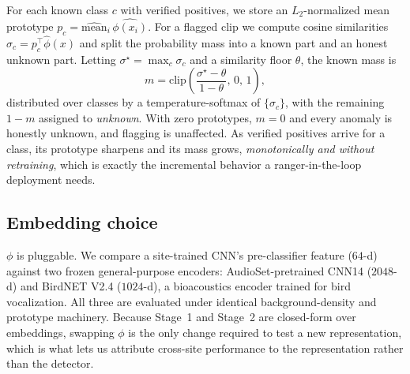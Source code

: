 For each known class $c$ with verified positives, we store an
$L_2$-normalized mean prototype $p_c = \widehat{\mathrm{mean}}_i\, \widehat{\phi(x_i)}$.
For a flagged clip we compute cosine similarities $\sigma_c = p_c^\top \hat\phi(x)$
and split the probability mass into a known part and an honest unknown part.
Letting $\sigma^\star = \max_c \sigma_c$ and a similarity floor $\theta$, the
known mass is
\begin{equation}
m = \mathrm{clip}\!\left(\frac{\sigma^\star - \theta}{1 - \theta},\, 0,\, 1\right),
\end{equation}
distributed over classes by a temperature-softmax of $\{\sigma_c\}$, with the
remaining $1-m$ assigned to \emph{unknown}. With zero prototypes, $m = 0$ and
every anomaly is honestly unknown, and flagging is unaffected. As verified
positives arrive for a class, its prototype sharpens and its mass grows,
\emph{monotonically and without retraining}, which is exactly the incremental
behavior a ranger-in-the-loop deployment needs.

\subsection{Embedding choice}

$\phi$ is pluggable. We compare a site-trained CNN's pre-classifier feature
($64$-d) against two frozen general-purpose encoders: AudioSet-pretrained CNN14
($2048$-d) and BirdNET V2.4 ($1024$-d), a bioacoustics encoder trained for bird
vocalization. All three are evaluated under identical background-density and
prototype machinery. Because Stage~1 and Stage~2 are closed-form over
embeddings, swapping $\phi$ is the only change required to test a new
representation, which is what lets us attribute cross-site performance to the
representation rather than the detector.

